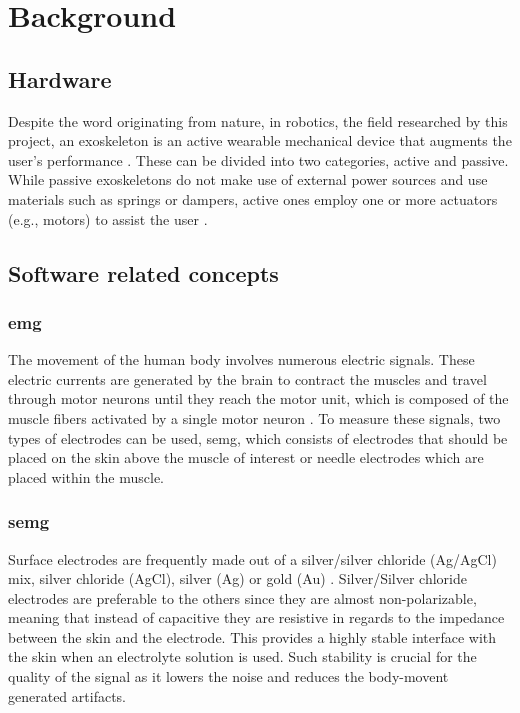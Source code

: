 \section{Background}
\label{section:background}

\subsection{Hardware}

Despite the word originating from nature, in robotics, the field researched by this project, an exoskeleton is an active wearable %
mechanical device that augments the user's performance \cite{exodefinition}. These can be divided into two categories, active and passive. 
While passive exoskeletons do not make use of external power sources and use materials such as springs or dampers, active ones employ 
one or more actuators (e.g., motors) to assist the user \cite{passiveactiveexo}.


\subsection{Software related concepts}

\subsubsection{\acf{emg}}

The movement of the human body involves numerous electric signals. These electric currents are generated by the brain
to contract the muscles and travel through motor neurons until they reach the motor unit, which is composed of the muscle fibers
activated by a single motor neuron \cite{emggen}. To measure these signals, two types of electrodes can be used, \ac{semg}, 
which consists of electrodes that should be placed on the skin above the muscle of interest or needle electrodes which are placed within 
the muscle. 

\subsubsection{\acf{semg}}

Surface electrodes are frequently made out of a silver/silver chloride (Ag/AgCl) mix, silver chloride (AgCl), silver (Ag) or gold (Au) \cite{sEMG}.
Silver/Silver chloride electrodes are preferable to the others since they are almost non-polarizable, meaning that instead of capacitive
they are resistive in regards to the impedance between the skin and the electrode. This provides a highly stable interface with the skin when 
an electrolyte solution is used. Such stability is crucial for the quality of the signal as it lowers the noise and reduces the body-movent generated
artifacts.

